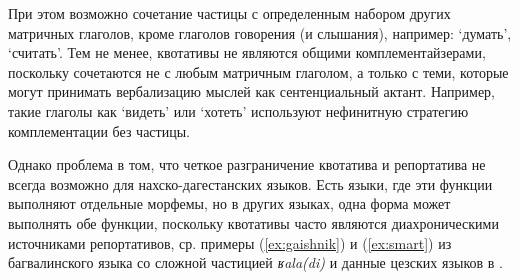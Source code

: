 

При этом возможно сочетание частицы с определенным набором других матричных глаголов, кроме глаголов говорения (и слышания), например: `думать', `считать'. Тем не менее, квотативы не являются общими комплементайзерами, поскольку сочетаются не с любым матричным глаголом, а только с теми, которые могут принимать вербализацию мыслей как сентенциальный актант. Например, такие глаголы как `видеть' или `хотеть' используют нефинитную стратегию комплементации без частицы.
\par Однако проблема в том, что четкое разграничение квотатива и репортатива не всегда возможно для нахско-дагестанских языков. Есть языки, где эти функции выполняют отдельные морфемы, но в других языках, одна форма может выполнять обе функции, поскольку квотативы часто являются диахроническими источниками репортативов, ср. примеры (\ref{ex:gaishnik}) и (\ref{ex:smart}) из багвалинского языка со сложной частицией \textit{ʁala(di)} и данные цезских языков в \citep[42--44]{khalilova2011}.



